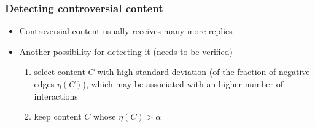 \documentclass{beamer}
\begin{document}

\begin{frame}[c]
    \frametitle{Detecting controversial content}

    \begin{itemize}
        \item Controversial content usually receives many more replies
        \item Another possibility for detecting it (needs to be verified)
            \begin{enumerate}
                \item select content $C$ with high standard deviation (of the
                    fraction of negative edges $\eta(C)$), which may be
                    associated with an higher number of interactions
                \item keep content $C$ whose $\eta(C) > \alpha $
            \end{enumerate}
    \end{itemize}
\end{frame}
\end{document}
